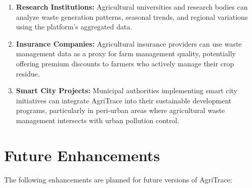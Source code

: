 \documentclass[a4paper,12pt,oneside]{report}
\let\originalitem\item
\renewcommand{\item}{\Needspace{10\baselineskip}\originalitem}
\begin{document}
\begin{enumerate}
    \item \textbf{Research Institutions:} Agricultural universities and research bodies can analyze waste generation patterns, seasonal trends, and regional variations using the platform's aggregated data.

    \item \textbf{Insurance Companies:} Agricultural insurance providers can use waste management data as a proxy for farm management quality, potentially offering premium discounts to farmers who actively manage their crop residue.

    \item \textbf{Smart City Projects:} Municipal authorities implementing smart city initiatives can integrate AgriTrace into their sustainable development programs, particularly in peri-urban areas where agricultural waste management intersects with urban pollution control.
\end{enumerate}

\section{Future Enhancements}

\noindent The following enhancements are planned for future versions of AgriTrace:
\end{document}
